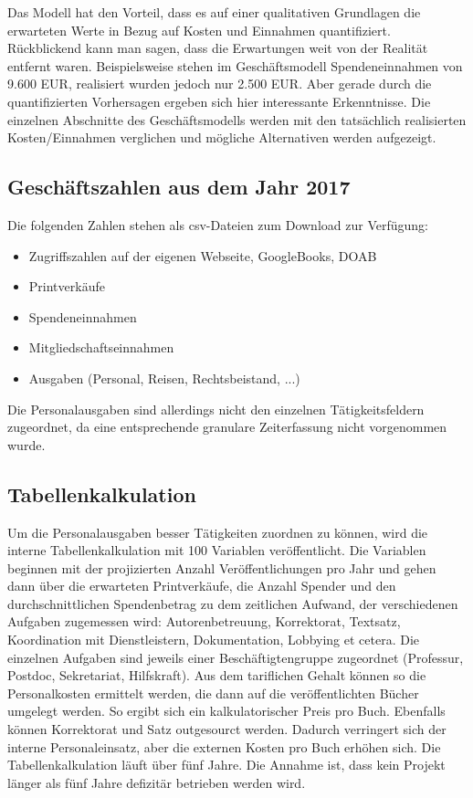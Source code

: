 \documentclass[a4paper,
fontsize=11pt,
oneside,
numbers=noperiodatend,
parskip=half-,
bibliography=totoc,
final
]{scrartcl}
\begin{document}
Das Modell hat den Vorteil, dass es auf einer qualitativen Grundlagen
die erwarteten Werte in Bezug auf Kosten und Einnahmen quantifiziert.
Rückblickend kann man sagen, dass die Erwartungen weit von der Realität
entfernt waren. Beispielsweise stehen im Geschäftsmodell
Spendeneinnahmen von 9.600 EUR, realisiert wurden jedoch nur 2.500 EUR.
Aber gerade durch die quantifizierten Vorhersagen ergeben sich hier
interessante Erkenntnisse. Die einzelnen Abschnitte des Geschäftsmodells
werden mit den tatsächlich realisierten Kosten/Einnahmen verglichen und
mögliche Alternativen werden aufgezeigt.

\hypertarget{geschuxe4ftszahlen-aus-dem-jahr-2017}{%
\subsection{Geschäftszahlen aus dem Jahr
2017}\label{geschuxe4ftszahlen-aus-dem-jahr-2017}}

Die folgenden Zahlen stehen als csv-Dateien zum Download zur Verfügung:

\begin{itemize}
\item
  Zugriffszahlen auf der eigenen Webseite, GoogleBooks, DOAB
\item
  Printverkäufe
\item
  Spendeneinnahmen
\item
  Mitgliedschaftseinnahmen
\item
  Ausgaben (Personal, Reisen, Rechtsbeistand, ...)
\end{itemize}

Die Personalausgaben sind allerdings nicht den einzelnen
Tätigkeitsfeldern zugeordnet, da eine entsprechende granulare
Zeiterfassung nicht vorgenommen wurde.

\hypertarget{tabellenkalkulation}{%
\subsection{Tabellenkalkulation}\label{tabellenkalkulation}}

Um die Personalausgaben besser Tätigkeiten zuordnen zu können, wird die
interne Tabellenkalkulation mit 100 Variablen veröffentlicht. Die
Variablen beginnen mit der projizierten Anzahl Veröffentlichungen pro
Jahr und gehen dann über die erwarteten Printverkäufe, die Anzahl
Spender und den durchschnittlichen Spendenbetrag zu dem zeitlichen
Aufwand, der verschiedenen Aufgaben zugemessen wird: Autorenbetreuung,
Korrektorat, Textsatz, Koordination mit Dienstleistern, Dokumentation,
Lobbying et cetera. Die einzelnen Aufgaben sind jeweils einer
Beschäftigtengruppe zugeordnet (Professur, Postdoc, Sekretariat,
Hilfskraft). Aus dem tariflichen Gehalt können so die Personalkosten
ermittelt werden, die dann auf die veröffentlichten Bücher umgelegt
werden. So ergibt sich ein kalkulatorischer Preis pro Buch. Ebenfalls
können Korrektorat und Satz outgesourct werden. Dadurch verringert sich
der interne Personaleinsatz, aber die externen Kosten pro Buch erhöhen
sich. Die Tabellenkalkulation läuft über fünf Jahre. Die Annahme ist,
dass kein Projekt länger als fünf Jahre defizitär betrieben werden wird.
\end{document}
